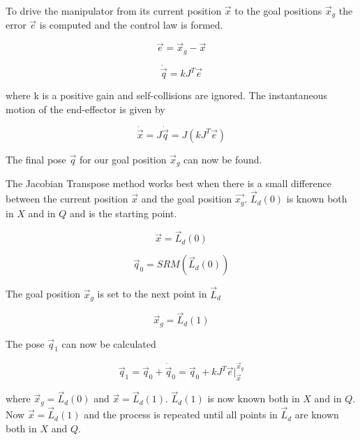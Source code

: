 To drive the manipulator from its current position $\vec{x}$ to the goal positions $\vec{x}_g$ the error $\vec{e}$ is computed and the control law is formed.

\begin{equation}
\vec{e} = \vec{x}_g - \vec{x}
\end{equation}

\begin{equation}
\dot{\vec{q}} = kJ^T\vec{e}
\end{equation}

where k is a positive gain and self-collisions are ignored.  The instantaneous motion of the end-effector is given by

\begin{equation}
\dot{\vec{x}} = J\dot{\vec{q}} = J(kJ^T\vec{e})
\end{equation}

The final pose $\vec{q}$ for our goal position $\vec{x}_g$ can now be found.

The Jacobian Transpose method works best when there is a small difference between the current position $\vec{x}$ and the goal position $\vec{x_g}$.  $\vec{L}_d(0)$ is known both in $X$ and in $Q$ and is the starting point.

\begin{equation}
\vec{x} = \vec{L}_d(0)
\end{equation}

\begin{equation}
\vec{q}_0 = SRM  \left( \vec{L}_d(0) \right)
\end{equation}

The goal position $\vec{x}_g$ is set to the next point in $\vec{L}_d$

\begin{equation}
\vec{x}_g = \vec{L}_d(1)
\end{equation}

The pose $\vec{q}_1$ can now be calculated

\begin{equation}
\vec{q}_1 = \vec{q}_0 + \dot{\vec{q}}_0 = \vec{q}_0 + kJ^T\vec{e}|_{\vec{x}}^{\vec{x}_g}
\end{equation}

where $\vec{x}_g = \vec{L}_d(0)$ and $\vec{x} = \vec{L}_d(1)$.  $\vec{L}_d(1)$ is now known both in $X$ and in $Q$.  Now $\vec{x} = \vec{L}_d(1)$ and the process is repeated until all points in $\vec{L}_d$ are known both in $X$ and $Q$.





